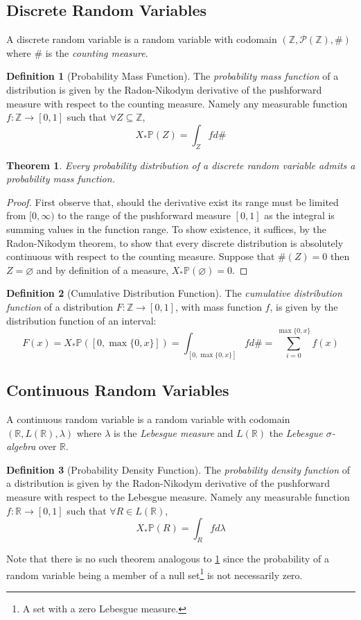 \documentclass[a4paper,11pt,oneside]{book}
\theoremstyle{plain}
\newtheorem{thm}{Theorem}[section]
\theoremstyle{definition}
\newtheorem{defn}{Definition}[section]
\begin{document}
\subsection{Discrete Random Variables}
A discrete random variable is a random variable with codomain $(\mathbb{Z},\mathcal{P}(\mathbb{Z}),\#)$ where $\#$ is the \emph{counting measure}.
\begin{defn}[Probability Mass Function]
The \emph{probability mass function} of a distribution is given by the Radon-Nikodym derivative of the pushforward measure with respect to the counting measure. Namely any measurable function $f:\mathbb{Z} \rightarrow [0,1]$ such that $\forall Z \subseteq \mathbb{Z}$, \[X_*\mathbb{P}(Z)=\int_Zfd\#\]
\end{defn}
\begin{thm} \label{discdist}
Every probability distribution of a discrete random variable admits a probability mass function.
\end{thm}
\begin{proof}
First observe that, should the derivative exist its range must be limited from $[0,\infty)$ to the range of the pushforward measure $[0,1]$ as the integral is summing values in the function range. To show existence, it suffices, by the Radon-Nikodym theorem, to show that every discrete distribution is absolutely continuous with respect to the counting measure. Suppose that $\#(Z)=0$ then $Z=\varnothing$ and by definition of a measure, $X_*\mathbb{P}(\varnothing)=0$.
\end{proof}
\begin{defn}[Cumulative Distribution Function]
The \emph{cumulative distribution function} of a distribution $F:\mathbb{Z}\rightarrow [0,1]$, with mass function $f$, is given by the distribution function of an interval:
\[F(x)=X_*\mathbb{P}([0,\max\{0,x\}])=\int_{[0,\max\{0,x\}]}fd\#=\sum_{i=0}^{\max\{0,x\}}f(x)\]
\end{defn}
\subsection{Continuous Random Variables}
A continuous random variable is a random variable with codomain $(\mathbb{R},L(\mathbb{R}),\lambda)$ where $\lambda$ is the \emph{Lebesgue measure} and $L(\mathbb{R})$ the \emph{Lebesgue $\sigma$-algebra} over $\mathbb{R}$.
\begin{defn}[Probability Density Function]
The \emph{probability density function} of a distribution is given by the Radon-Nikodym derivative of the pushforward measure with respect to the Lebesgue measure. Namely any measurable function $f:\mathbb{R} \rightarrow [0,1]$ such that $\forall R \in L(\mathbb{R})$, \[X_*\mathbb{P}(R)=\int_Rfd\lambda\]
\end{defn}
Note that there is no such theorem analogous to \ref{discdist} since the probability of a random variable being a member of a null set\footnote{A set with a zero Lebesgue measure.} is not necessarily zero.
\end{document}
